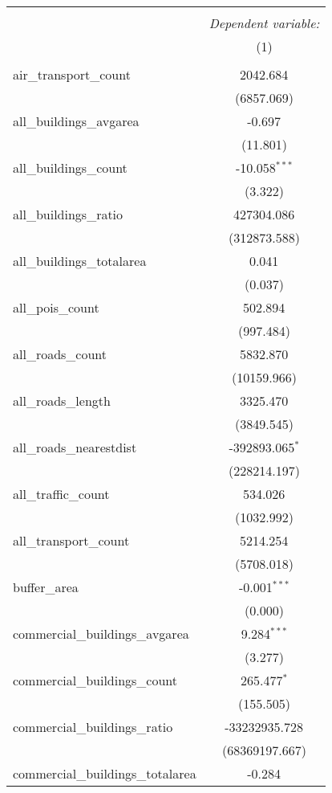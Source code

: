 \begin{table}[!htbp] \centering
\begin{tabular}{@{\extracolsep{5pt}}lc}
\\[-1.8ex]\hline
\hline \\[-1.8ex]
& \multicolumn{1}{c}{\textit{Dependent variable:}} \
\cr \cline{1-2}
\\[-1.8ex] & (1) \\
\hline \\[-1.8ex]
 air_transport_count & 2042.684$^{}$ \\
  & (6857.069) \\
 all_buildings_avgarea & -0.697$^{}$ \\
  & (11.801) \\
 all_buildings_count & -10.058$^{***}$ \\
  & (3.322) \\
 all_buildings_ratio & 427304.086$^{}$ \\
  & (312873.588) \\
 all_buildings_totalarea & 0.041$^{}$ \\
  & (0.037) \\
 all_pois_count & 502.894$^{}$ \\
  & (997.484) \\
 all_roads_count & 5832.870$^{}$ \\
  & (10159.966) \\
 all_roads_length & 3325.470$^{}$ \\
  & (3849.545) \\
 all_roads_nearestdist & -392893.065$^{*}$ \\
  & (228214.197) \\
 all_traffic_count & 534.026$^{}$ \\
  & (1032.992) \\
 all_transport_count & 5214.254$^{}$ \\
  & (5708.018) \\
 buffer_area & -0.001$^{***}$ \\
  & (0.000) \\
 commercial_buildings_avgarea & 9.284$^{***}$ \\
  & (3.277) \\
 commercial_buildings_count & 265.477$^{*}$ \\
  & (155.505) \\
 commercial_buildings_ratio & -33232935.728$^{}$ \\
  & (68369197.667) \\
 commercial_buildings_totalarea & -0.284$^{}$ \\

\end{tabular}
\end{table}
